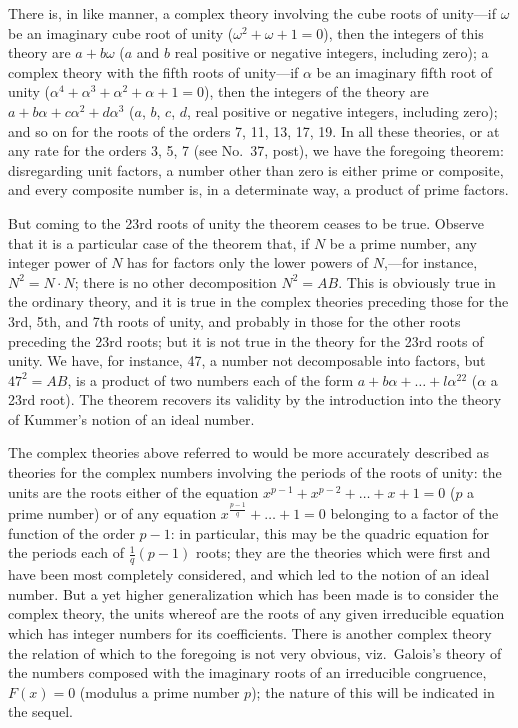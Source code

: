 \documentclass[11pt,a4paper]{book}
\begin{document}
There is, in like manner, a complex theory involving the cube roots of unity---if $\omega$ be an imaginary cube root of unity ($\omega^{2} + \omega + 1 = 0$), then the integers of this theory are $a + b\omega$ ($a$ and $b$ real positive or negative integers, including zero); a complex theory with the fifth roots of unity---if $\alpha$ be an imaginary fifth root of unity ($\alpha^{4} + \alpha^{3} + \alpha^{2} + \alpha + 1 = 0$), then the integers of the theory are $a + b\alpha + c\alpha^{2} + d\alpha^{3}$ ($a$, $b$, $c$, $d$, real positive or negative integers, including zero); and so on for the roots of the orders 7, 11, 13, 17, 19. In all these theories, or at any rate for the orders 3, 5, 7 (see No.~37, post), we have the foregoing theorem: disregarding unit factors, a number other than zero is either prime or composite, and every composite number is, in a determinate way, a product of prime factors.

But coming to the 23rd roots of unity the theorem ceases to be true. Observe that it is a particular case of the theorem that, if $N$ be a prime number, any integer power of $N$ has for factors only the lower powers of $N$,---for instance, $N^{2} = N \cdot N$; there is no other decomposition $N^{2} = AB$. This is obviously true in the ordinary theory, and it is true in the complex theories preceding those for the 3rd, 5th, and 7th roots of unity, and probably in those for the other roots preceding the 23rd roots; but it is not true in the theory for the 23rd roots of unity. We have, for instance, 47, a number not decomposable into factors, but $47^{2} = AB$, is a product of two numbers each of the form $a + b\alpha + \ldots + l\alpha^{22}$ ($\alpha$ a 23rd root). The theorem recovers its validity by the introduction into the theory of Kummer's notion of an ideal number.

The complex theories above referred to would be more accurately described as theories for the complex numbers involving the periods of the roots of unity: the units are the roots either of the equation $x^{p-1} + x^{p-2} + \ldots + x + 1 = 0$ ($p$ a prime number) or of any equation $x^{\frac{p-1}{q}} + \ldots + 1 = 0$ belonging to a factor of the function of the order $p - 1$: in particular, this may be the quadric equation for the periods each of $\frac{1}{q}(p - 1)$ roots; they are the theories which were first and have been most completely considered, and which led to the notion of an ideal number. But a yet higher generalization which has been made is to consider the complex theory, the units whereof are the roots of any given irreducible equation which has integer numbers for its coefficients. There is another complex theory the relation of which to the foregoing is not very obvious, viz.\ Galois's theory of the numbers composed with the imaginary roots of an irreducible congruence, $F(x) = 0$ (modulus a prime number $p$); the nature of this will be indicated in the sequel.
\end{document}
